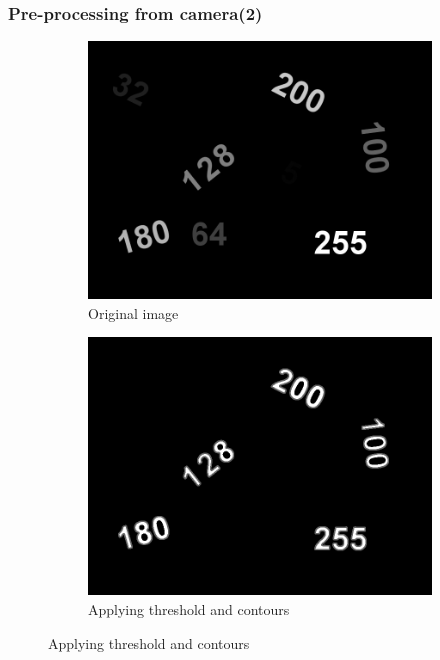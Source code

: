 \documentclass[11.5pt,aspectratio=1610,xcolor={usenames,dvipsnames,table}]{beamer}
\begin{document}
\begin{frame}
\frametitle{Pre-processing from camera(2)}
	\begin{figure}[H]
	\begin{subfigure}{0.45\textwidth}
	\includegraphics[width=1 \textwidth]{images/threshold.jpg}
	\caption{Original image}
	\end{subfigure}
	\begin{subfigure}{0.45\textwidth}
	\includegraphics[width=1 \textwidth]{images/Contour1.png}
	\caption{Applying threshold and contours}
	\end{subfigure}
	
	\end{figure}
\end{frame}
\end{document}
